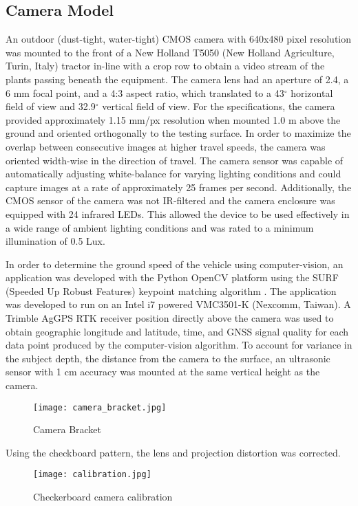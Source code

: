 \subsection{Camera Model}
An outdoor (dust-tight, water-tight) CMOS camera with 640x480 pixel
resolution was mounted to the front of a New Holland T5050 (New
Holland Agriculture, Turin, Italy) tractor in-line with a crop row to
obtain a video stream of the plants passing beneath the equipment. The
camera lens had an aperture of 2.4, a 6 mm focal point, and a 4:3
aspect ratio, which translated to a 43$^{\circ}$ horizontal field of view and
32.9$^{\circ}$ vertical field of view. For the specifications, the camera
provided approximately 1.15 mm/px resolution when mounted 1.0 m above
the ground and oriented orthogonally to the testing surface. In order
to maximize the overlap between consecutive images at higher travel
speeds, the camera was oriented width-wise in the direction of
travel. The camera sensor was capable of automatically adjusting
white-balance for varying lighting conditions and could capture images
at a rate of approximately 25 frames per second. Additionally, the
CMOS sensor of the camera was not IR-filtered and the camera enclosure
was equipped with 24 infrared LEDs. This allowed the device to be used
effectively in a wide range of ambient lighting conditions and was
rated to a minimum illumination of 0.5 Lux.

In order to determine the ground speed of the vehicle using
computer-vision, an application was developed with the Python OpenCV
platform using the SURF (Speeded Up Robust Features) keypoint matching
algorithm \cite{bay}. The application was developed to run on an
Intel i7 powered VMC3501-K (Nexcomm, Taiwan). A Trimble AgGPS RTK
receiver position directly above the camera was used to obtain
geographic longitude and latitude, time, and GNSS signal quality for
each data point produced by the computer-vision algorithm. To account
for variance in the subject depth, the distance from the camera to the
surface, an ultrasonic sensor with 1 cm accuracy was mounted at the
same vertical height as the camera.

\begin{figure}
  \centering
  \texttt{[image: camera\_bracket.jpg]}
  \caption{Camera Bracket}
  \label{fig:camera_bracket}
\end{figure}

Using the checkboard pattern, the lens and projection distortion was corrected.
\begin{figure}
  \centering
  \texttt{[image: calibration.jpg]}
  \caption{Checkerboard camera calibration}
  \label{fig:calibration}
\end{figure}

